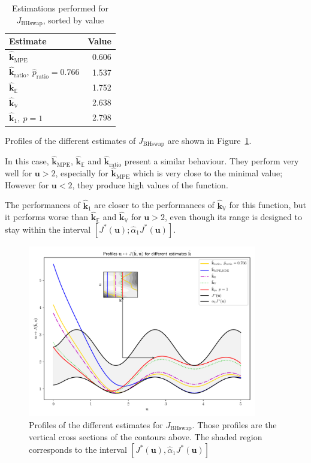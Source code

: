 \documentclass[preprint, 1p]{elsarticle}
\newcommand{\Ex}{\mathbb{E}}
\newcommand{\hatkmean}{\hat{\mathbf{k}}_{\Ex}}
\newcommand{\hatkvar}{\hat{\mathbf{k}}_{\mathbb{V}}}
\newcommand{\hatkmpe}{\hat{\mathbf{k}}_{\mathrm{MPE}}}
\newcommand{\kest}{\hat{\mathbf{k}}}
\newcommand{\checka}{{\alpha}}
\newcommand{\checkk}{\mathbf{k}}
\begin{document}
\begin{table}[!h]
\centering
\caption{Estimations performed for $J_{\mathrm{BHswap}}$, sorted by value}
\label{tab:recap_estimates_BHs}
\begin{tabular}{lr} \toprule
Estimate & Value \\ \midrule
$\kest_{\mathrm{MPE}}$ & 0.606 \\ 
$\kest_{\mathrm{ratio}},~ \hat{p}_{\mathrm{ratio}}=0.766$ & 1.537 \\ 
$\hatkmean$ & 1.752 \\ 
$\hatkvar$ & 2.638 \\ 
$\kest_1,~p=1$ & 2.798   \\ \bottomrule
\end{tabular}
\end{table}


Profiles of the different estimates of $J_{\mathrm{BHswap}}$ are shown in Figure~\ref{fig:profiles_branin_switch}.

In this case, $\hatkmpe$, $\hatkmean$ and $\hat{\checkk}_{\mathrm{ratio}}$ present a similar behaviour. They perform very well for $\mathbf{u}>2$, especially for $\hatkmpe$ which is very close to the minimal value; However for $\mathbf{u}<2$, they produce high values of the function.

The performances of $\hat{\checkk}_1$ are closer to the performances of $\hatkvar$ for this function, but it performs worse than $\hatkmean$ and $\hatkvar$ for $\mathbf{u}>2$, even though its range is designed to stay within the interval $[J^*(\mathbf{u}); \hat{\checka}_1 J^*(\mathbf{u})]$.


\begin{figure}[!h]
  \centering
\includegraphics[width=10cm]{Figures/profile_BHs.pdf}
\caption{Profiles of the different estimates for $J_{\mathrm{BHswap}}$. Those profiles are the vertical cross sections of the contours above. The shaded region corresponds to the interval $[J^*(\mathbf{u}), \hat{\checka}_1 J^*(\mathbf{u})]$}
\label{fig:profiles_branin_switch}
\end{figure}
\end{document}
